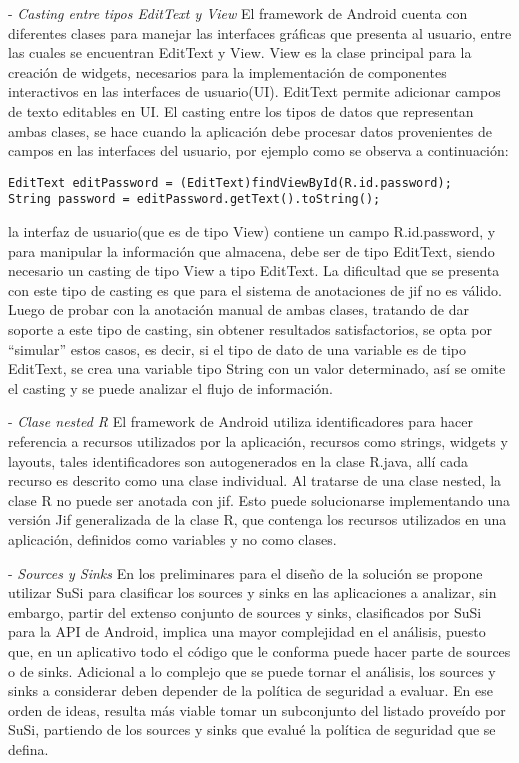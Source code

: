 - \textit{Casting entre tipos EditText y View}\newline
El framework de Android cuenta con diferentes clases para manejar las interfaces
gráficas que presenta al usuario, entre las cuales se encuentran EditText y
View. View es la clase principal para la creación de widgets, necesarios para la
implementación de componentes interactivos en las interfaces de usuario(UI).
EditText permite adicionar campos de texto editables en UI. El casting entre los
tipos de datos que representan ambas clases, se hace cuando la aplicación debe
procesar datos provenientes de campos en las interfaces del usuario, por ejemplo
como se observa a continuación:
\begin{lstlisting}
EditText editPassword = (EditText)findViewById(R.id.password);
String password = editPassword.getText().toString();
\end{lstlisting}
la interfaz de usuario(que es de tipo View) contiene un campo R.id.password, y
para manipular la información que almacena, debe ser de tipo EditText, siendo
necesario un casting de tipo View a tipo EditText. La dificultad que se presenta
con este tipo de casting es que para el sistema de anotaciones de jif no es
válido. Luego de probar con la anotación manual de ambas clases, tratando de
dar soporte a este tipo de casting, sin obtener resultados satisfactorios, se
opta por ``simular'' estos casos, es decir, si el tipo de dato de una variable
es de tipo EditText, se crea una variable tipo String con un valor determinado,
así se omite el casting y se puede analizar el flujo de información.

- \textit{Clase nested R}\newline
El framework de Android utiliza identificadores para hacer referencia a recursos
utilizados por la aplicación, recursos como strings, widgets y layouts, tales
identificadores son autogenerados en la clase R.java, allí cada recurso es
descrito como una clase individual. Al tratarse de una clase nested, la clase R
no puede ser anotada con jif. Esto puede solucionarse implementando una
versión Jif generalizada de la clase R, que contenga los recursos utilizados en
una aplicación, definidos como variables y no como clases.

- \textit{Sources y Sinks}\newline
En los preliminares para el diseño de la solución se propone utilizar SuSi
para clasificar los sources y sinks en las aplicaciones a analizar, sin embargo, partir del
extenso conjunto de sources y sinks, clasificados por SuSi para la API de
Android, implica una mayor complejidad en el análisis, puesto que, en un
aplicativo todo el código que le conforma puede hacer parte de sources o de
sinks. Adicional a lo complejo que se puede tornar el análisis, los sources y
sinks a considerar deben depender de la política de seguridad a evaluar. En ese
orden de ideas, resulta más viable tomar un subconjunto del listado proveído por
SuSi, partiendo de los sources y sinks que evalué la política de seguridad que
se defina.

